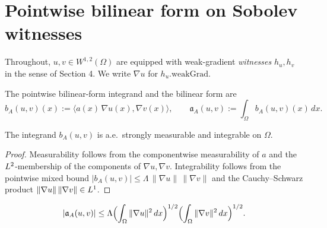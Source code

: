 \section{Pointwise bilinear form on Sobolev witnesses}

Throughout, $u, v \in W^{1,2}(\Omega)$ are equipped with weak-gradient \emph{witnesses} $h_u, h_v$ in the sense of Section 4. We write $\nabla u$ for $h_u.\mathrm{weakGrad}$.

\begin{definition}
\label{def:bilinFormIntegrandOfCoeff}
\leanok
{}
The pointwise bilinear-form integrand and the bilinear form are
\begin{equation*}
  b_A(u,v)(x) := \langle a(x)\,\nabla u(x), \nabla v(x)\rangle, \qquad
  \mathfrak{a}_A(u,v) := \int_{\Omega} b_A(u,v)(x)\,dx.
\end{equation*}
\end{definition}

\begin{lemma}
\label{lem:aestronglyMeasurable_bilinFormIntegrandOfCoeff}
\leanok
{}
The integrand $b_A(u,v)$ is a.e.\ strongly measurable and integrable on $\Omega$.
\end{lemma}

\begin{proof}
\leanok
{}

Measurability follows from the componentwise measurability of $a$ and the $L^{2}$-membership of the components of $\nabla u, \nabla v$. Integrability follows from the pointwise mixed bound $|b_A(u,v)| \leq \Lambda\,\|\nabla u\|\,\|\nabla v\|$ and the Cauchy--Schwarz product $\|\nabla u\|\,\|\nabla v\| \in L^{1}$.
\end{proof}

\begin{lemma}
\label{lem:bilinForm_bound}
\leanok
{}
\begin{equation*}
  |\mathfrak{a}_A(u,v)| \leq \Lambda
  \Bigl(\int_{\Omega} \|\nabla u\|^{2}\,dx\Bigr)^{1/2}
  \Bigl(\int_{\Omega} \|\nabla v\|^{2}\,dx\Bigr)^{1/2}.
\end{equation*}
\end{lemma}

